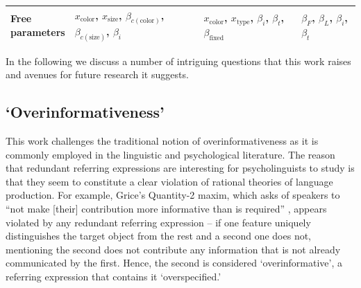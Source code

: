 \documentclass[11pt]{article}
\begin{document}
\begin{table}
\begin{tabular}{p{2.5cm} p{4.2cm} p{4.2cm} p{4.2cm} }
\midrule
\makecell{Free\\ parameters} & 
	\makecell{$x_{\textrm{color}}$, $x_{\textrm{size}}$, \\ $\beta_{c(\textrm{color})}$,  $\beta_{c(\textrm{size})}$, $\beta_i$} & 
	\makecell{$x_{\textrm{color}}$, $x_{\textrm{type}}$, \\ $\beta_i$, $\beta_t$, $\beta_{\textrm{fixed}}$} & 
	$\beta_F$, $\beta_L$, $\beta_i$, $\beta_t$ \\
\bottomrule
\end{tabular}
\label{tab:modeldiffs}
\end{table}


In the following we discuss a number of intriguing questions that this work raises and avenues for future research it suggests.

\subsection{`Overinformativeness'}

This work challenges the traditional notion of overinformativeness as it is commonly employed in the linguistic and psychological literature. The reason that redundant referring expressions are interesting for psycholinguists to study is that they seem to constitute a clear violation of rational theories of language production. For example, Grice's Quantity-2 maxim, which asks of speakers to ``not make [their] contribution more informative than is required'' \cite{grice1975}, appears violated by any redundant referring expression -- if one feature uniquely distinguishes the target object from the rest and a second one does not, mentioning the second does not contribute any information that is not already communicated by the first. Hence, the second is considered `overinformative', a referring expression that contains it  `overspecified.'
\end{document}
